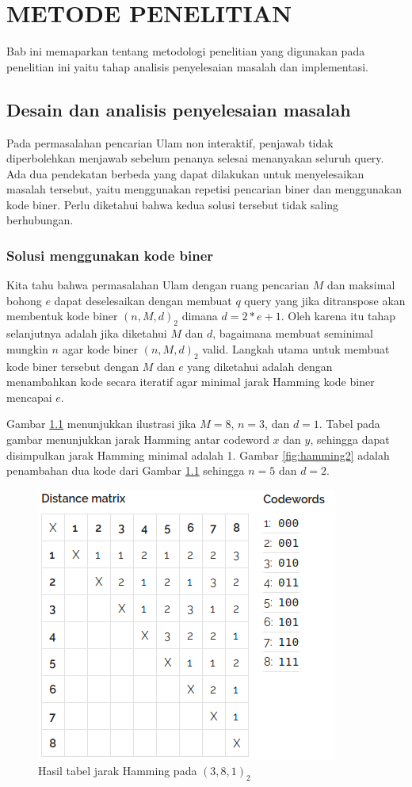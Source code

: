 \chapter{METODE PENELITIAN}

Bab ini memaparkan tentang metodologi penelitian yang digunakan pada penelitian ini yaitu tahap analisis penyelesaian masalah dan implementasi.

\section{Desain dan analisis penyelesaian masalah}

Pada permasalahan pencarian Ulam non interaktif, penjawab tidak diperbolehkan menjawab sebelum penanya selesai menanyakan seluruh query. Ada dua pendekatan berbeda yang dapat dilakukan untuk menyelesaikan masalah tersebut, yaitu menggunakan repetisi pencarian biner dan menggunakan kode biner. Perlu diketahui bahwa kedua solusi tersebut tidak saling berhubungan.

\subsection{Solusi menggunakan kode biner}

Kita tahu bahwa permasalahan Ulam dengan ruang pencarian $M$ dan maksimal bohong $e$ dapat deselesaikan dengan membuat $q$ query yang jika ditranspose akan membentuk kode biner $(n,M,d)_2$ dimana $d = 2*e+1$. Oleh karena itu tahap selanjutnya adalah jika diketahui $M$ dan $d$, bagaimana membuat seminimal mungkin $n$ agar kode biner $(n,M,d)_2$ valid. Langkah utama untuk membuat kode biner tersebut dengan $M$ dan $e$ yang diketahui adalah dengan menambahkan kode secara iteratif agar minimal jarak Hamming kode biner mencapai $e$.

Gambar \ref{fig:hamming1} menunjukkan ilustrasi jika $M = 8$, $n = 3$, dan $d = 1$. Tabel pada gambar  menunjukkan jarak Hamming antar codeword $x$ dan $y$, sehingga dapat disimpulkan jarak Hamming minimal adalah 1. Gambar \ref{fig:hamming2} adalah penambahan dua kode dari Gambar \ref{fig:hamming1} sehingga $n = 5$ dan $d = 2$.

\begin{figure}
\centering
\includegraphics[scale=0.7]{../img/hamming1.png}
\caption{Hasil tabel jarak Hamming pada $(3,8,1)_2$}
\label{fig:hamming1}
\end{figure}


